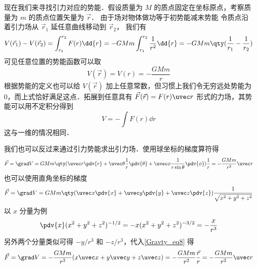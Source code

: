 现在我们来寻找引力对应的势能．假设质量为 $M$ 的质点固定在坐标原点，考察质量为 $m$ 的质点位置矢量为 $\vec r$． 由于场对物体做功等于初势能减末势能
令质点沿着引力场从 ${\vec r_1}$ 延任意曲线移动到 $\vec r_2$， 我们有
\begin{equation}
V(\vec r_1) - V(\vec r_2) = \int_{r_1}^{r_2} F(r) \dd{r} =  - GMm\int_{r_1}^{r_2} \frac{1}{r^2} \dd{r}  =  - GMm \qty( \frac{1}{r_1} - \frac{1}{r_2} )
\end{equation}
可见任意位置的势能函数可以取
\begin{equation}
V(\vec r) = V(r) = - \frac{GMm}{r}
\end{equation}
根据势能的定义也可以给 $V(\vec r)$ 加上任意常数，但习惯上我们令无穷远处势能为 0，而上式恰好满足这点．拓展到任意具有 $\vec F(\vec r) = F(r)\uvec r$ 形式的力场，其势能可以用不定积分得到
\begin{equation}
V = -\int F(r) \dd{r}
\end{equation}
这与一维的情况相同．%

我们也可以反过来通过引力势能求出引力场．使用球坐标的梯度算符得%
\begin{equation}
\vec F = \grad V = GMm \qty( \uvec r\pdv{r} + \uvec \theta \frac{1}{r}\pdv{\theta} + \uvec \phi \frac{1}{r\sin \theta}\pdv{\phi} )\frac{1}{r} =  - \frac{GMm}{r^2}\uvec r
\end{equation}
也可以使用直角坐标的梯度
\begin{equation}\label{Gravty_eq8}
\vec F = \grad V = GMm \qty(\uvec x\pdv{x} + \uvec y\pdv{y} + \uvec z\pdv{z} )\frac{1}{\sqrt{x^2 + y^2 + z^2}}
\end{equation}
以 $x$ 分量为例
\begin{equation}
\pdv{x}(x^2 + y^2 + z^2)^{-1/2} =  - x(x^2 + y^2 + z^2)^{-3/2} =  - \frac{x}{r^3}
\end{equation}
另外两个分量类似可得 $- y/r^3$ 和 $- z/r^3$，代入\autoref{Gravty_eq8} 得
\begin{equation}
\vec F = \grad V =  - \frac{GMm}{r^3} (x\uvec x + y\uvec y + z\uvec z) =  - \frac{GMm}{r^2}\frac{\vec r}{r} =  - \frac{GMm}{r^2}\uvec r
\end{equation}
